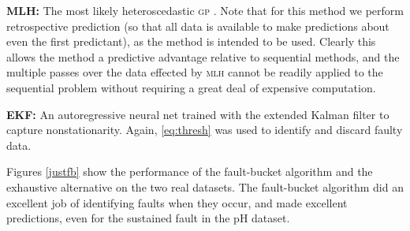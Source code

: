 \documentclass{article} %
\newcommand{\given}{\!\ensuremath{\mid}\!}
\newcommand{\bm}[1]{\ensuremath{\mathbf{#1}}}
\newcommand{\acro}[1]{\textsc{\MakeLowercase{#1}}}
\newcommand{\vect}[1]{\bm{#1}}
\newcommand{\vy}{\vect{y}}
\newcommand{\mean}[2]{{m}(#1\given#2)}
\begin{document}

{\bf MLH:} 
The most likely heteroscedastic  \acro{gp} \citep{kersting2007most}. Note that for this method we perform retrospective prediction (so that all data is available to make predictions about even the first predictant), as the method is intended to be used. Clearly this allows the method a predictive advantage relative to sequential methods, and the multiple passes over the data effected by \acro{mlh} cannot be readily applied to the sequential problem without requiring a great deal of expensive computation. 

{\bf EKF:}
An autoregressive neural net trained with the extended Kalman filter to capture nonstationarity. Again, \eqref{eq:thresh} was used to identify and discard faulty data.






Figures \ref{justfb} show the performance of the
fault-bucket algorithm and the exhaustive alternative on the two real datasets. The fault-bucket algorithm did an excellent
job of identifying faults when they occur, and made excellent
predictions, even for the sustained fault in the pH dataset. 
\end{document}
